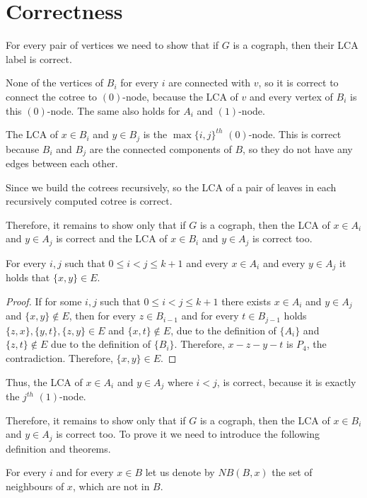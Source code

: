 \section{Correctness}
For every pair of vertices we need to show that if $G$ is a cograph, then their LCA label is correct.

None of the vertices of $B_i$ for every $i$ are connected with $v$, so it is correct to connect the cotree to $(0)$-node, because the LCA of $v$ and every vertex of $B_i$ is this $(0)$-node. The same also holds for $A_i$ and $(1)$-node.

The LCA of $x \in B_i$ and $y \in B_j$ is the $\max{\{i,j\}}^{th}$ $(0)$-node. This is correct because $B_i$ and $B_j$ are the connected components of $B$, so they do not have any edges between each other.

Since we build the cotrees recursively, so the LCA of a pair of leaves in each recursively computed cotree is correct. 

Therefore, it remains to show only that if $G$ is a cograph, then the LCA of $x \in A_i$ and $y \in A_j$ is correct and the LCA of $x \in B_i$ and $y \in A_j$ is correct too.

\begin{theorem}
\label{one_label_subtree}
    For every $i,j$ such that $0 \leq i < j \leq k + 1$ and every $x \in A_i$ and every $y \in A_j$ it holds that $\{x,y\} \in E$. 
\end{theorem}
\begin{proof}
    If for some $i,j$ such that $0 \leq i < j \leq k + 1$ there exists $x \in A_i$ and $y \in A_j$ and $\{x,y\} \notin E$, then for every $z \in B_{i-1}$ and for every $t \in B_{j-1}$ holds $\{z,x\}, \{y,t\}, \{z, y\} \in E$ and $\{x,t\} \notin E$, due to the definition of $\{A_i\}$ and $\{z,t\} \notin E$ due to the definition of $\{B_i\}$. Therefore, $x-z-y-t$ is $P_4$, the contradiction. Therefore, $\{x,y\} \in E$.
\end{proof}
Thus, the LCA of $x \in A_i$ and $y \in A_j$ where $i < j$, is correct, because it is exactly the $j^{th}$ $(1)$-node.

Therefore, it remains to show only that if $G$ is a cograph, then the LCA of $x \in B_i$ and $y \in A_j$ is correct too. To prove it we need to introduce the following definition and theorems.
\begin{definition}
    For every $i$ and for every $x \in B$ let us denote by \emph{$NB(B,x)$} the set of neighbours of $x$, which are not in $B$.
\end{definition}

